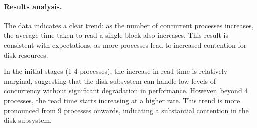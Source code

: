 \paragraph{Results analysis.}
The data indicates a clear trend: as the number of concurrent processes increases, the average time taken to read a single block also increases. This result is consistent with expectations, as more processes lead to increased contention for disk resources.

In the initial stages (1-4 processes), the increase in read time is relatively marginal, suggesting that the disk subsystem can handle low levels of concurrency without significant degradation in performance. However, beyond 4 processes, the read time starts increasing at a higher rate. This trend is more pronounced from 9 processes onwards, indicating a substantial contention in the disk subsystem.